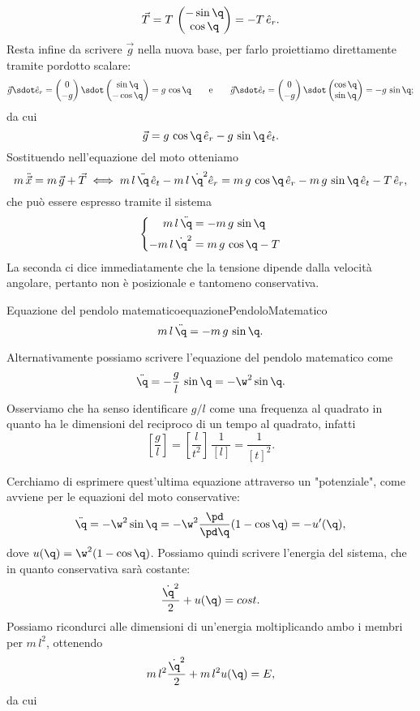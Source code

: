\[
	\vec{T} = T\,\begin{pmatrix}-\sin\q\\\cos \q\end{pmatrix} = -T\,\hat{e}_r.
\]
Resta infine da scrivere \(\vec{g}\) nella nuova base, per farlo proiettiamo direttamente tramite pordotto scalare:
\[
	\vec{g}\sdot \hat{e}_r = \begin{pmatrix}0\\-g\end{pmatrix}\sdot\begin{pmatrix}\sin\q\\-\cos\q\end{pmatrix} = g\,\cos\q \qquad\text{e}\qquad
	\vec{g}\sdot \hat{e}_t = \begin{pmatrix}0\\-g\end{pmatrix}\sdot\begin{pmatrix}\cos\q\\\sin\q\end{pmatrix} = -g\,\sin\q;
\]
da cui
\[
	\vec{g} = g\,\cos\q\,\hat{e}_r - g\,\sin\q\,\hat{e}_t.
\]
Sostituendo nell'equazione del moto otteniamo
\[
	m\,\ddot{\vec{x}} = m\,\vec{g}+\vec{T} \iff m\,l\,\ddot{\q}\,\hat{e}_t - m\,l\,\dot{\q}^2 \hat{e}_r = m\,g\,\cos\q\,\hat{e}_r - m\,g\,\sin\q\,\hat{e}_t - T\,\hat{e}_r,
\]
che può essere espresso tramite il sistema
\[
	\left\{\begin{aligned}
		m\,l\,\ddot{\q}   & = -m\,g\,\sin\q     \\
		-m\,l\,\dot{\q}^2 & = m\,g\,\cos\q - T
	\end{aligned}\right.
\]
La seconda ci dice immediatamente che la tensione dipende dalla velocità angolare, pertanto non è posizionale e tantomeno conservativa.

\begin{remark}{Equazione del pendolo matematico}{equazionePendoloMatematico}
	\[
		m\,l\,\ddot{\q} = -m\,g\,\sin\q.
	\]
\end{remark}

\begin{notz}
	Alternativamente possiamo scrivere l'equazione del pendolo matematico come
	\[
		\ddot{\q} = -\frac{g}{l}\,\sin\q = -\w^2\sin\q.
	\]
	Osserviamo che ha senso identificare \(g/l\) come una frequenza al quadrato in quanto ha le dimensioni del reciproco di un tempo al quadrato, infatti
	\[
		\left[ \frac{g}{l} \right]  = \left[ \frac{l}{t^2} \right]\,\frac{1}{[l]} = \frac{1}{[t]^2}.
	\]
\end{notz}
\noindent
Cerchiamo di esprimere quest'ultima equazione attraverso un "potenziale", come avviene per le equazioni del moto conservative:
\[
	\ddot{\q} = -\w^2\sin\q = -\w^2 \frac{\pd}{\pd\q}(1-\cos\q) = -u'(\q),
\]
dove \(u(\q) = \w^2(1-\cos\q)\). Possiamo quindi scrivere l'energia del sistema, che in quanto conservativa sarà costante:
\[
	\frac{\dot{\q}^2}{2} + u(\q) = cost.
\]
Possiamo ricondurci alle dimensioni di un'energia moltiplicando ambo i membri per \(m\,l^2\), ottenendo
\[
	m\,l^2 \frac{\dot{\q}^2}{2} + m\,l^2 u(\q) = E,
\]
da cui

